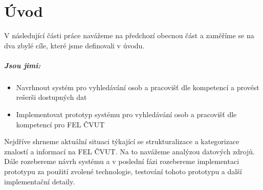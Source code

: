 \chapter{Úvod}
V následující části práce navážeme na předchozí obecnou část a zaměříme se na dva zbylé cíle, které jsme definovali v úvodu.\par
\paragraph{Jsou jimi:}
\begin{itemize}
    \item Navrhnout systém pro vyhledávání osob a pracovišť dle kompetencí a provést rešerši dostupných dat
    \item Implementovat prototyp systému pro vyhledávání osob a pracovišť dle kompetencí pro FEL ČVUT 
\end{itemize}
Nejdříve shrneme aktuální situaci týkající se strukturalizace a kategorizace znalostí a informací na FEL ČVUT. Na to navážeme analýzou datových zdrojů. Dále rozebereme návrh systému a v poslední fázi rozebereme implementaci prototypu za použití zvolené technologie, testování tohoto prototypu a další implementační detaily.

